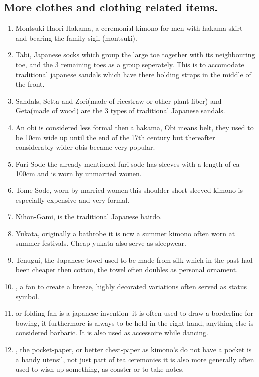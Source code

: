 \documentclass{article}
\newcommand\tabi[1][0.05cm]{\hspace*{#1}}
\begin{document}
\subsection{More clothes and clothing related items.}
\begin{enumerate}
    \item Montsuki-Haori-Hakama, a ceremonial kimono for men with hakama skirt and bearing the family sigil (montsuki).
    \item Tabi, Japanese socks which group the large toe together with its neighbouring toe, and the 3 remaining toes as a group seperately. This is to accomodate traditional japanese sandals which have there holding straps in the middle of the front.
    \item Sandals, Setta and Zori(made of ricestraw or other plant fiber) and Geta(made of wood) are the 3 types of traditional Japanese sandals.
    \item An obi is considered less formal then a hakama, Obi means belt, they used to be 10cm wide up until the end of the 17th century but thereafter considerably wider obis became very popular.
    \item Furi-Sode the already mentioned furi-sode has sleeves with a length of ca 100cm and is worn by unmarried women.
    \item Tome-Sode, worn by married women this shoulder short sleeved kimono is especially expensive and very formal.
    \item Nihon-Gami, is the traditional Japanese hairdo.
    \item Yukata, originally a bathrobe it is now a summer kimono often worn at summer festivals. Cheap yukata also serve as sleepwear.
    \item Tenugui, the Japanese towel used to be made from silk which in the past had been cheaper then cotton, the towel often doubles as personal ornament.
    \item {} \tabi, a fan to create a breeze, highly decorated variations often served as status symbol.
    \item {} or folding fan is a japanese invention, it is often used to draw a borderline for bowing, it furthermore is always to be held in the right hand, anything else is considered barbaric. It is also used as accessoire while dancing.
    \item {}, the pocket-paper, or better chest-paper as kimono's do not have a pocket is a handy utensil, not just part of tea ceremonies it is also more generally often used to wish up something, as coaster or to take notes.
\end{enumerate}
\end{document}
